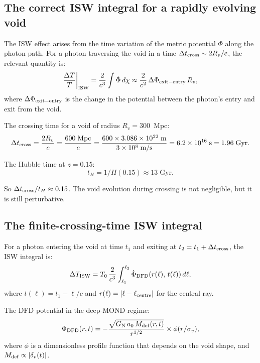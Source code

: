 \documentclass[11pt,a4paper]{article}
\newcommand{\aM}{a_0}
\newcommand{\GN}{G_{\rm N}}
\newcommand{\ee}[1]{\times 10^{#1}}
\begin{document}
\subsection{The correct ISW integral for a rapidly evolving void}

The ISW effect arises from the time variation of the metric potential
$\Phi$ along the photon path. For a photon traversing the void in a
time $\Delta t_{\rm cross} \sim 2R_v/c$, the relevant quantity is:
\begin{equation}
\frac{\Delta T}{T}\bigg|_{\rm ISW}
= \frac{2}{c^3}\int \dot{\Phi}\,d\chi
\approx \frac{2}{c^2}\,\Delta\Phi_{\rm exit-entry}\,R_v,
\end{equation}
where $\Delta\Phi_{\rm exit-entry}$ is the change in the potential
between the photon's entry and exit from the void.

The crossing time for a void of radius $R_v = 300$~Mpc:
\begin{equation}
\Delta t_{\rm cross} = \frac{2R_v}{c} = \frac{600\;\text{Mpc}}{c}
= \frac{600\times 3.086\ee{22}\;\text{m}}{3\ee{8}\;\text{m/s}}
= 6.2\ee{16}\;\text{s} = 1.96\;\text{Gyr}.
\label{eq:crossing-time}
\end{equation}

The Hubble time at $z = 0.15$:
\begin{equation}
t_H = 1/H(0.15) \approx 13\;\text{Gyr}.
\end{equation}

So $\Delta t_{\rm cross}/t_H \approx 0.15$. The void evolution during
crossing is not negligible, but it is still perturbative.

\subsection{The finite-crossing-time ISW integral}

For a photon entering the void at time $t_1$ and exiting at $t_2
= t_1 + \Delta t_{\rm cross}$, the ISW integral is:
\begin{equation}
\Delta T_{\rm ISW} = T_0\,\frac{2}{c^3}\int_{\ell_1}^{\ell_2}
\dot{\Phi}_{\rm DFD}(r(\ell),\,t(\ell))\,d\ell,
\label{eq:ISW-finite}
\end{equation}
where $t(\ell) = t_1 + \ell/c$ and $r(\ell) = |\ell - \ell_{\rm centre}|$
for the central ray.

The DFD potential in the deep-MOND regime:
\begin{equation}
\Phi_{\rm DFD}(r,t) = -\frac{\sqrt{\GN\,\aM\,M_{\rm def}(r,t)}}{r^{1/2}}
\times \phi(r/\sigma_v),
\label{eq:Phi-DFD-deep}
\end{equation}
where $\phi$ is a dimensionless profile function that depends on the
void shape, and $M_{\rm def} \propto |\delta_v(t)|$.
\end{document}
